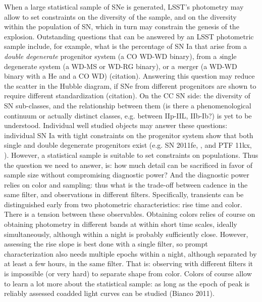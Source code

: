 When a large statistical sample of SNe is generated, LSST's photometry may allow to set constraints on the diversity of the sample, and on the diversity within the population of SN, which in turn may constrain the genesis of the explosion. Outstanding questions that can be answered by an LSST photometric sample include, for example, what is the percentage of SN Ia that arise from a \emph{double degenerate} progenitor system (a CO WD-WD binary), from a {\emph single degenerate} system (a WD-MS or WD-RG binary), or a {\emph merger} (a WD-WD binary with a He and a CO WD) (citation). Answering this question may reduce the scatter in the Hubble diagram, if SNe from different progenitors are shown to require different standardization (citation). On the CC SN side: the diversity of SN sub-classes, and the relationship between them (is there a phenomenological continuum or actually distinct classes, e.g. between IIp-IIL, IIb-Ib?) is yet to be understood. Individual well studied objects may answer these questions: individual SN Ia with tight constraints on the progenitor system show that both single and double degenerate progenitors exist (e.g. SN 2011fe, \citealt{Li2011}, and PTF 11kx, \citealt{Dilday11}). However, a statistical sample is suitable to set constraints on populations. Thus the question  we need to answer, is: how much detail can be sacrificed in favor of sample size without compromising diagnostic power? And the diagnostic power relies on color and sampling: thus what is the trade-off between cadence in the same filter, and observations in different filters. Specifically, transients can be distinguished early from two photometric characteristics: rise time and color. There is a tension between these observables. Obtaining colors relies of course on obtaining photometry in different bands at within short time scales, ideally simultaneously, although within a night is probably sufficiently close. However, assessing the rise slope is best done with a single filter, so prompt characterization also needs multiple epochs within a night, although separated by at least a few hours, in the same filter. That is: observing with different filters it is impossible (or very hard) to separate shape from color. Colors of course allow to learn a lot more about the statistical sample: as long as the epoch of peak is reliably assessed coadded light curves can be studied (Bianco 2011).


